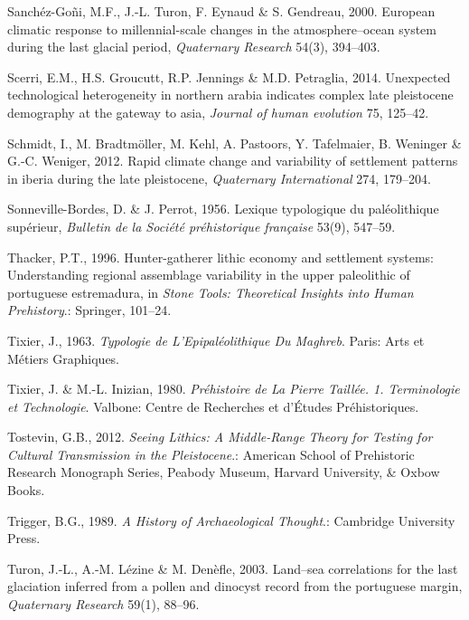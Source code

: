 \documentclass[12pt,twoside]{reedthesis}
\begin{document}
\leavevmode\hypertarget{ref-goni2000}{}%
Sanchéz-Goñi, M.F., J.-L. Turon, F. Eynaud \& S. Gendreau, 2000. European climatic response to millennial-scale changes in the atmosphere--ocean system during the last glacial period, \emph{Quaternary Research} 54(3), 394--403.

\leavevmode\hypertarget{ref-scerri2014}{}%
Scerri, E.M., H.S. Groucutt, R.P. Jennings \& M.D. Petraglia, 2014. Unexpected technological heterogeneity in northern arabia indicates complex late pleistocene demography at the gateway to asia, \emph{Journal of human evolution} 75, 125--42.

\leavevmode\hypertarget{ref-schmidt2012}{}%
Schmidt, I., M. Bradtmöller, M. Kehl, A. Pastoors, Y. Tafelmaier, B. Weninger \& G.-C. Weniger, 2012. Rapid climate change and variability of settlement patterns in iberia during the late pleistocene, \emph{Quaternary International} 274, 179--204.

\leavevmode\hypertarget{ref-sonneville-bordes1956}{}%
Sonneville-Bordes, D. \& J. Perrot, 1956. Lexique typologique du paléolithique supérieur, \emph{Bulletin de la Société préhistorique française} 53(9), 547--59.

\leavevmode\hypertarget{ref-thacker1996}{}%
Thacker, P.T., 1996. Hunter-gatherer lithic economy and settlement systems: Understanding regional assemblage variability in the upper paleolithic of portuguese estremadura, in \emph{Stone Tools: Theoretical Insights into Human Prehistory}.: Springer, 101--24.

\leavevmode\hypertarget{ref-tixier1963}{}%
Tixier, J., 1963. \emph{Typologie de L'Epipaléolithique Du Maghreb}. Paris: Arts et Métiers Graphiques.

\leavevmode\hypertarget{ref-tixier1980}{}%
Tixier, J. \& M.-L. Inizian, 1980. \emph{Préhistoire de La Pierre Taillée. 1. Terminologie et Technologie}. Valbone: Centre de Recherches et d'Études Préhistoriques.

\leavevmode\hypertarget{ref-tostevin2012}{}%
Tostevin, G.B., 2012. \emph{Seeing Lithics: A Middle-Range Theory for Testing for Cultural Transmission in the Pleistocene}.: American School of Prehistoric Research Monograph Series, Peabody Museum, Harvard University, \& Oxbow Books.

\leavevmode\hypertarget{ref-trigger1989}{}%
Trigger, B.G., 1989. \emph{A History of Archaeological Thought}.: Cambridge University Press.

\leavevmode\hypertarget{ref-turon2003}{}%
Turon, J.-L., A.-M. Lézine \& M. Denèfle, 2003. Land--sea correlations for the last glaciation inferred from a pollen and dinocyst record from the portuguese margin, \emph{Quaternary Research} 59(1), 88--96.
\end{document}
